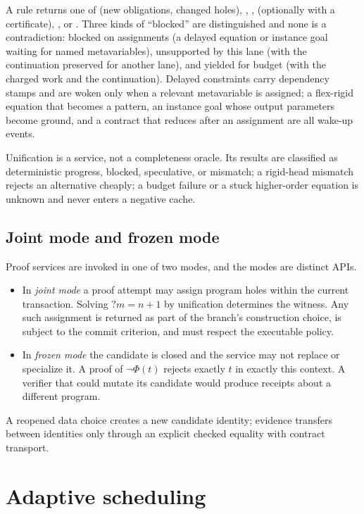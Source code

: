 A rule returns one of  (new obligations, changed holes), , ,  (optionally with a certificate), , or . Three kinds of ``blocked'' are distinguished and none is a contradiction: blocked on assignments (a delayed equation or instance goal waiting for named metavariables), unsupported by this lane (with the continuation preserved for another lane), and yielded for budget (with the charged work and the continuation). Delayed constraints carry dependency stamps and are woken only when a relevant metavariable is assigned; a flex-rigid equation that becomes a pattern, an instance goal whose output parameters become ground, and a contract that reduces after an assignment are all wake-up events.

Unification is a service, not a completeness oracle. Its results are classified as deterministic progress, blocked, speculative, or mismatch; a rigid-head mismatch rejects an alternative cheaply; a budget failure or a stuck higher-order equation is unknown and never enters a negative cache.

\subsection{Joint mode and frozen mode}\label{sec:joint-frozen}

Proof services are invoked in one of two modes, and the modes are distinct APIs.
\begin{itemize}
\item In \emph{joint mode} a proof attempt may assign program holes within the current transaction. Solving $?m = n + 1$ by unification determines the witness. Any such assignment is returned as part of the branch's construction choice, is subject to the commit criterion, and must respect the executable policy.
\item In \emph{frozen mode} the candidate is closed and the service may not replace or specialize it. A proof of $\neg\Phi(t)$ rejects exactly $t$ in exactly this context. A verifier that could mutate its candidate would produce receipts about a different program.
\end{itemize}
A reopened data choice creates a new candidate identity; evidence transfers between identities only through an explicit checked equality with contract transport.

\section{Adaptive scheduling}\label{sec:scheduling}

